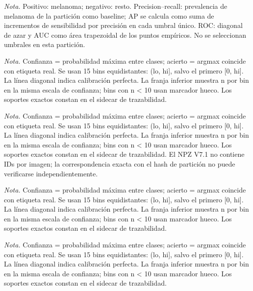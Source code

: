 \caption{Curvas de precisión–sensibilidad y ROC de melanoma frente al resto en ISIC 2020 · ajuste supervisado.}
\textit{Nota.} Positivo: melanoma; negativo: resto. Precision–recall: prevalencia de melanoma de la partición como baseline; AP se calcula como suma de incrementos de sensibilidad por precisión en cada umbral único. ROC: diagonal de azar y AUC como área trapezoidal de los puntos empíricos. No se seleccionan umbrales en esta partición.

\caption{Confiabilidad de las probabilidades por clase predicha en HAM10000 · E3b canónico.}
\textit{Nota.} Confianza = probabilidad máxima entre clases; acierto = argmax coincide con etiqueta real. Se usan 15 bins equidistantes: (lo, hi], salvo el primero [0, hi]. La línea diagonal indica calibración perfecta. La franja inferior muestra n por bin en la misma escala de confianza; bins con n < 10 usan marcador hueco. Los soportes exactos constan en el sidecar de trazabilidad.

\caption{Confiabilidad de las probabilidades por clase predicha en HAM10000 · validación v7.1.}
\textit{Nota.} Confianza = probabilidad máxima entre clases; acierto = argmax coincide con etiqueta real. Se usan 15 bins equidistantes: (lo, hi], salvo el primero [0, hi]. La línea diagonal indica calibración perfecta. La franja inferior muestra n por bin en la misma escala de confianza; bins con n < 10 usan marcador hueco. Los soportes exactos constan en el sidecar de trazabilidad. El NPZ V7.1 no contiene IDs por imagen; la correspondencia exacta con el hash de partición no puede verificarse independientemente.

\caption{Confiabilidad de las probabilidades por clase predicha en ISIC 2019 · E1 canónico.}
\textit{Nota.} Confianza = probabilidad máxima entre clases; acierto = argmax coincide con etiqueta real. Se usan 15 bins equidistantes: (lo, hi], salvo el primero [0, hi]. La línea diagonal indica calibración perfecta. La franja inferior muestra n por bin en la misma escala de confianza; bins con n < 10 usan marcador hueco. Los soportes exactos constan en el sidecar de trazabilidad.

\caption{Confiabilidad de las probabilidades por clase predicha en ISIC 2020 · E1 canónico.}
\textit{Nota.} Confianza = probabilidad máxima entre clases; acierto = argmax coincide con etiqueta real. Se usan 15 bins equidistantes: (lo, hi], salvo el primero [0, hi]. La línea diagonal indica calibración perfecta. La franja inferior muestra n por bin en la misma escala de confianza; bins con n < 10 usan marcador hueco. Los soportes exactos constan en el sidecar de trazabilidad.

